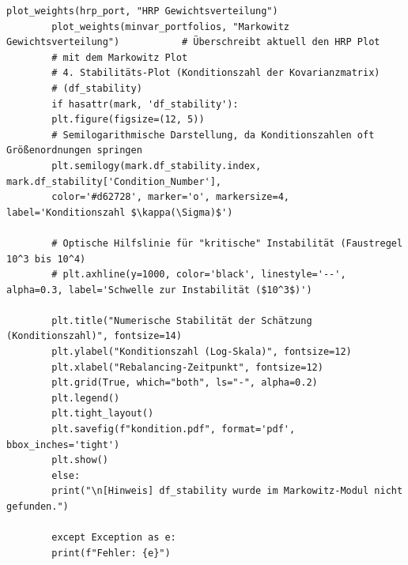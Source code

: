 \documentclass[parskip=half]{scrartcl}
\begin{document}
\begin{lstlisting}[caption={Auswertung und Plots}, label={lst:vgl_code}]
		plot_weights(hrp_port, "HRP Gewichtsverteilung")
		plot_weights(minvar_portfolios, "Markowitz Gewichtsverteilung")           # Überschreibt aktuell den HRP Plot
		# mit dem Markowitz Plot
		# 4. Stabilitäts-Plot (Konditionszahl der Kovarianzmatrix)
		# (df_stability)
		if hasattr(mark, 'df_stability'):
		plt.figure(figsize=(12, 5))
		# Semilogarithmische Darstellung, da Konditionszahlen oft Größenordnungen springen
		plt.semilogy(mark.df_stability.index, mark.df_stability['Condition_Number'], 
		color='#d62728', marker='o', markersize=4, label='Konditionszahl $\kappa(\Sigma)$')
		
		# Optische Hilfslinie für "kritische" Instabilität (Faustregel 10^3 bis 10^4)
		# plt.axhline(y=1000, color='black', linestyle='--', alpha=0.3, label='Schwelle zur Instabilität ($10^3$)')
		
		plt.title("Numerische Stabilität der Schätzung (Konditionszahl)", fontsize=14)
		plt.ylabel("Konditionszahl (Log-Skala)", fontsize=12)
		plt.xlabel("Rebalancing-Zeitpunkt", fontsize=12)
		plt.grid(True, which="both", ls="-", alpha=0.2)
		plt.legend()
		plt.tight_layout()
		plt.savefig(f"kondition.pdf", format='pdf', bbox_inches='tight')
		plt.show()
		else:
		print("\n[Hinweis] df_stability wurde im Markowitz-Modul nicht gefunden.")
		
		except Exception as e:
		print(f"Fehler: {e}")
		
	\end{lstlisting}
	
\end{document}
